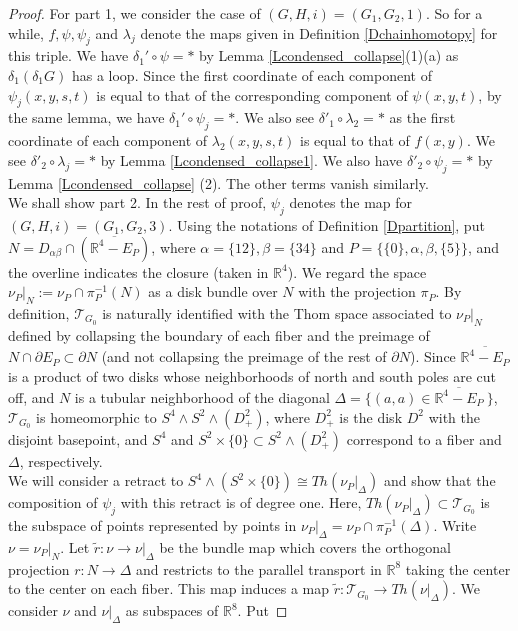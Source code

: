 \documentclass[reqno]{amsart}
\theoremstyle{definition}
\theoremstyle{plain}
\newcommand{\TT}{\mathcal{T}} %
\newcommand{\RR}{\mathbb{R}}
\begin{document}
\begin{proof}
For part 1, we consider the case of $(G,H,i)=(G_1,G_2,1)$. So for a while, $f, \psi, \psi_j$ and $\lambda_j$ denote the maps given in Definition \ref{Dchainhomotopy} for this triple. We have $\delta_1'\circ \psi=*$ by Lemma \ref{Lcondensed_collapse}(1)(a) as $\delta_1(\delta_1G)$ has a loop. Since the first coordinate of each component of $\psi_j(x,y,s,t)$ is equal to that of the corresponding component of $\psi(x,y,t)$, by the same lemma, we have $\delta_1'\circ \psi_j=*$. We also see  $\delta'_1\circ\lambda_{2}=*$  as the first coordinate of each component of $\lambda_2(x,y,s,t)$ is equal to that  of $f(x,y)$. We see $\delta'_2\circ \lambda_j=*$ by Lemma \ref{Lcondensed_collapse1}. We also have $\delta'_2\circ\psi_j=*$ by Lemma \ref{Lcondensed_collapse} (2). The other terms vanish similarly.\\
\indent We shall show part 2. In the rest of proof, $\psi_j$ denotes the map for $(G,H,i)=(G_1,G_2,3)$.
 Using  the notations of Definition \ref{Dpartition}, put $N=D_{\alpha\beta}\cap (\overline{\RR^4-E_P})$, where $\alpha=\{12\}, \beta=\{34\}$ and $P=\{\{0\},\alpha, \beta,\{5\}\}$, and the overline indicates the closure (taken in $\RR^4$). We regard the space $\nu_P|_N:=\nu_P\cap\pi_P^{-1}(N)$ as a disk bundle over $N$ with the projection $\pi_P$.  By definition, $\TT_{G_0}$ is naturally identified with 
the Thom space associated to $\nu_P|_N$ defined  by collapsing the boundary of each fiber and the preimage of $N\cap \partial E_P\subset \partial N$ (and not collapsing the preimage of the rest of $\partial N$). Since $\overline{\RR^4-E_P}$ is  a product of two disks  whose neighborhoods of  north and south poles  are cut off,  and $N$ is a tubular neighborhood of the diagonal $\Delta=\{(a,a)\in \overline{\RR^4-E_P}\  \}$, 
$\TT_{G_0}$ is homeomorphic to $S^4\wedge S^2\wedge (D^2_+)$, where $D^2_+$ is the disk  $D^2$ with the disjoint basepoint, and  $S^4$ and $S^2\times\{0\}\subset S^2\wedge (D^2_+)$ correspond to a fiber and $\Delta$,  respectively. \\
\indent We will consider a retract to $S^4\wedge (S^2\times \{0\})\cong Th(\nu_P|_\Delta)$ and show that the composition of $\psi_j$ with this retract is of degree one. Here,  $Th(\nu_P|_\Delta)\subset \TT_{G_0}$ is the subspace  of points represented by points in $\nu_P|_\Delta=\nu_P\cap\pi_P^{-1}(\Delta)$.  Write $\nu=\nu_P|_N$. Let  $\tilde r: \nu\to \nu|_{\Delta}$ be the bundle map which covers the orthogonal projection $r:N\to \Delta$ and  restricts to the parallel transport in $\RR^8$ taking the  center to the center on each fiber. This map induces a map $\tilde r:\TT_{G_0}\to Th(\nu|_{\Delta})$.  We consider $\nu$ and $\nu|_\Delta$ as  subspaces of $\RR^8$. Put 

\end{proof}
\end{document}
